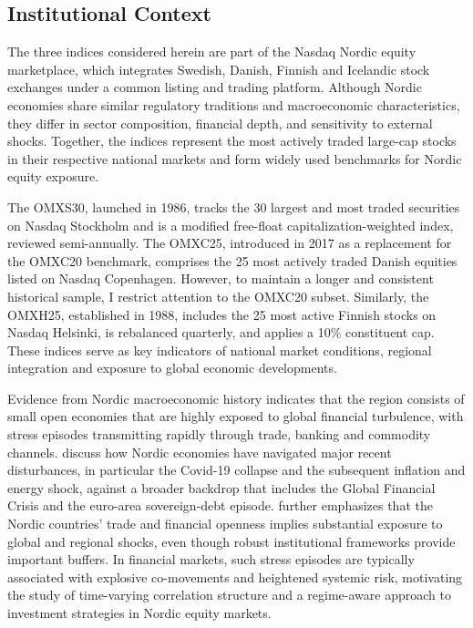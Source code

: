 \documentclass[pdflatex,sn-basic]{sn-jnl}%
\theoremstyle{thmstyleone}%
\theoremstyle{thmstyletwo}%
\theoremstyle{thmstylethree}%
\begin{document}
\subsection{Institutional Context}
The three indices considered herein are part of the Nasdaq Nordic equity marketplace,
which integrates Swedish, Danish, Finnish and Icelandic stock exchanges under a
common listing and trading platform. Although Nordic economies share
similar regulatory traditions and macroeconomic characteristics, they differ in
sector composition, financial depth, and sensitivity to external shocks. 
Together, the indices represent the most actively traded large-cap stocks in
their respective national markets and form widely used benchmarks for Nordic
equity exposure.

The OMXS30, launched in 1986, tracks the 30 largest and most traded securities
on Nasdaq Stockholm and is a modified free-float capitalization-weighted index,
reviewed semi-annually. The OMXC25, introduced in 2017 as a replacement for the 
OMXC20 benchmark, comprises the 25 most actively traded Danish equities listed on 
Nasdaq Copenhagen. However, to maintain a longer and consistent historical sample, 
I restrict attention to the OMXC20 subset.  Similarly, the OMXH25, established in 1988, 
includes the 25 most active Finnish stocks on Nasdaq Helsinki, is rebalanced quarterly, 
and applies a 10\% constituent cap. These indices serve as key indicators of national market
conditions, regional integration and exposure to global economic developments.

Evidence from Nordic macroeconomic history indicates that the region consists of
small open economies that are highly exposed to global financial turbulence, 
with stress episodes transmitting rapidly through trade, banking and commodity
channels. \citet{calmfors2024economic} discuss how Nordic economies have navigated 
major recent disturbances, in particular the Covid-19 collapse and the subsequent 
inflation and energy shock, against a broader backdrop that includes the Global Financial Crisis 
and the euro-area sovereign-debt episode. \citet{imf2013nordic} further 
emphasizes that the Nordic countries’ trade and financial openness implies substantial exposure 
to global and regional shocks, even though robust institutional frameworks provide important buffers. 
In financial markets, such stress episodes are typically associated with explosive 
co-movements and heightened systemic risk, motivating the study of time-varying correlation 
structure and a regime-aware approach to investment strategies in Nordic equity markets.
\end{document}
